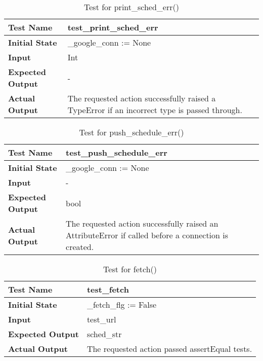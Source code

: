 \documentclass[12pt, titlepage]{article}
\begin{document}
		\begin{table}[!htbp]			
			\begin{tabularx}{\textwidth}{|l|X|}
				\hline
				\textbf{Test Name} & test\_print\_sched\_err
				\\ 
				\hline
				\textbf{Initial State} & \_google\_conn := None \\ 
				\hline
				\textbf{Input} & Int  \\ 
				\hline 
				\textbf{Expected Output} & - \\ 
				\hline				
				\textbf{Actual Output} & The requested action successfully raised a TypeError if an incorrect type is passed through. \\				
				\hline
			\end{tabularx}
			\caption{Test for print\_sched\_err()}
			\label{Table}
		\end{table}

		\begin{table}[!htbp]			
			\begin{tabularx}{\textwidth}{|l|X|}
				\hline
				\textbf{Test Name} & test\_push\_schedule\_err
				\\ 
				\hline
				\textbf{Initial State} & \_google\_conn := None \\ 
				\hline
				\textbf{Input} & -  \\ 
				\hline 
				\textbf{Expected Output} & bool \\ 
				\hline				
				\textbf{Actual Output} & The requested action successfully raised an AttributeError if called before a connection is created. \\				
				\hline
			\end{tabularx}
			\caption{Test for push\_schedule\_err()}
			\label{Table}
		\end{table}

		\begin{table}[!htbp]			
			\begin{tabularx}{\textwidth}{|l|X|}
				\hline
				\textbf{Test Name} & test\_fetch
				\\ 
				\hline
				\textbf{Initial State} & \_fetch\_flg := False \\ 
				\hline
				\textbf{Input} & test\_url  \\ 
				\hline 
				\textbf{Expected Output} & sched\_str \\ 
				\hline				
				\textbf{Actual Output} & The requested action passed assertEqual tests. \\				
				\hline
			\end{tabularx}
			\caption{Test for fetch()}
			\label{Table}
		\end{table}
\end{document}
